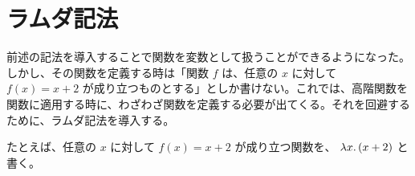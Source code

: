 \documentclass[book]{jlreq}
\newcommand{\p}[1]{ \mathord{ \left( #1 \right) } }
\begin{document}
\section{ラムダ記法}

前述の記法を導入することで関数を変数として扱うことができるようになった。しかし、その関数を定義する時は「関数 \( f \) は、任意の \( x \) に対して \( f \p{ x } = x + 2 \) が成り立つものとする」としか書けない。これでは、高階関数を関数に適用する時に、わざわざ関数を定義する必要が出てくる。それを回避するために、ラムダ記法を導入する。

たとえば、任意の \( x \) に対して \( f \p{ x } = x + 2 \) が成り立つ関数を、 \( \lambda x \ldotp \p{ x + 2 } \) と書く。
\end{document}
